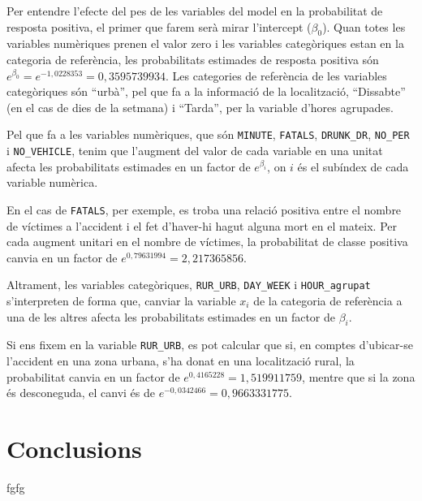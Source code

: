 \documentclass[12pt,longbibliography]{article}
\theoremstyle{definition}
\theoremstyle{remark}
\begin{document}
Per entendre l'efecte del pes de les variables del model en la probabilitat de resposta positiva, el primer que farem serà mirar l'intercept ($\beta_0$). Quan totes les variables numèriques prenen el valor zero i les variables categòriques estan en la categoria de referència, les probabilitats estimades de resposta positiva són $e^{\beta_0} = e^{-1,0228353} = 0,3595739934$. Les categories de referència de les variables categòriques són ``urbà'', pel que fa a la informació de la localització, ``Dissabte'' (en el cas de dies de la setmana) i ``Tarda'', per la variable d'hores agrupades.

Pel que fa a les variables numèriques, que són \texttt{MINUTE}, \texttt{FATALS}, \texttt{DRUNK\_DR}, \texttt{NO\_PER} i \texttt{NO\_VEHICLE}, tenim que l'augment del valor de cada variable en una unitat afecta les probabilitats estimades en un factor de $e^{\beta_i}$, on $i$ és el subíndex de cada variable numèrica.


En el cas de \texttt{FATALS}, per exemple, es troba una relació positiva entre el nombre de víctimes a l'accident i el fet d'haver-hi hagut alguna mort en el mateix. Per cada augment unitari en el nombre de víctimes, la probabilitat de classe positiva canvia en un factor de $e^{0,79631994} = 2,217365856$.


Altrament, les variables categòriques, \texttt{RUR\_URB}, \texttt{DAY\_WEEK} i \texttt{HOUR\_agrupat} s'interpreten de forma que, canviar la variable $x_i$ de la categoria de referència a una de les altres afecta les probabilitats estimades en un factor de $\beta_i$.


Si ens fixem en la variable \texttt{RUR\_URB}, es pot calcular que si, en comptes d'ubicar-se l'accident en una zona urbana, s'ha donat en una localització rural, la probabilitat canvia en un factor de $e^{0,4165228} = 1,519911759$, mentre que si la zona és desconeguda, el canvi és de $e^{-0,0342466} = 0,9663331775$.


\newpage

\section{Conclusions}
fgfg

\newpage

\end{document}
